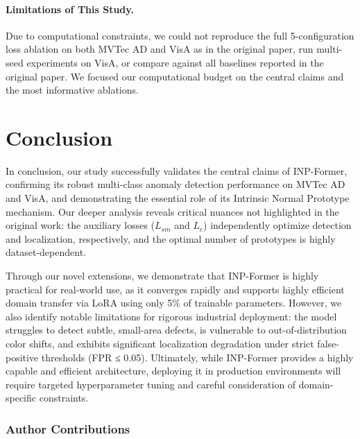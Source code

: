 \documentclass[10pt]{article} %
\begin{document}
\paragraph{Limitations of This Study.} Due to computational constraints, we could not reproduce the full 5-configuration loss ablation on both MVTec AD and VisA as in the original paper, run multi-seed experiments on VisA, or compare against all baselines reported in the original paper. We focused our computational budget on the central claims and the most informative ablations.


\section{Conclusion}
In conclusion, our study successfully validates the central claims of INP-Former, confirming its robust multi-class anomaly detection performance on MVTec AD and VisA, and demonstrating the essential role of its Intrinsic Normal Prototype mechanism. Our deeper analysis reveals critical nuances not highlighted in the original work: the auxiliary losses ($L_{sm}$ and $L_c$) independently optimize detection and localization, respectively, and the optimal number of prototypes is highly dataset-dependent.

Through our novel extensions, we demonstrate that INP-Former is highly practical for real-world use, as it converges rapidly and supports highly efficient domain transfer via LoRA using only 5\% of trainable parameters. However, we also identify notable limitations for rigorous industrial deployment: the model struggles to detect subtle, small-area defects, is vulnerable to out-of-distribution color shifts, and exhibits significant localization degradation under strict false-positive thresholds (FPR ≤ 0.05). Ultimately, while INP-Former provides a highly capable and efficient architecture, deploying it in production environments will require targeted hyperparameter tuning and careful consideration of domain-specific constraints.

\label{sec:conclusion}



\subsubsection*{Author Contributions}
\end{document}
